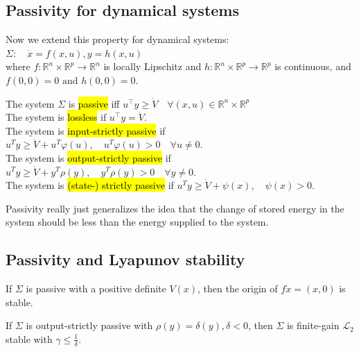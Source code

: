 \subsection{Passivity for dynamical systems}
Now we extend this property for dynamical systems: $\Sigma: \quad \dot{x}=f(x, u), y=h(x, u)$\\
where $f: \mathbb{R}^{n} \times \mathbb{R}^{p} \rightarrow \mathbb{R}^{n}$ is locally Lipschitz and $h: \mathbb{R}^{n} \times \mathbb{R}^{p} \rightarrow \mathbb{R}^{p}$ is continuous, and $f(0,0)=0 \text { and } h(0,0)=0$.

\begin{tcolorbox}[colback=white, colframe=teal]
\begin{definition}
    The system $\Sigma$ is \hl{passive} iff
    $u^{\top} y \geq \dot{V} \quad \forall(x, u) \in \mathbb{R}^{n} \times \mathbb{R}^{p}$\\
    The system is \hl{lossless} if  $u^{\top}y = \dot{V}$.\\
    The system is \hl{input-strictly passive} if $u^{T} y \geq \dot{V}+u^{T} \varphi(u), \quad u^{T} \varphi(u)>0 \quad \forall u \neq 0$.\\
    The system is \hl{output-strictly passive} if $u^{T} y \geq \dot{V}+y^{T} \rho(y), \quad y^{T} \rho(y)>0 \quad \forall y \neq 0$.\\
    The system is \hl{(state-) strictly passive} if $u^{T} y \geq \dot{V}+\psi(x), \quad \psi(x)>0$.
\end{definition}
\end{tcolorbox}

\begin{remark}
    Passivity really just generalizes the idea that the change of stored energy in the system should be less than the energy supplied to the system.
\end{remark}

\subsection{Passivity and Lyapunov stability}
\begin{lemma}
    If $\Sigma$ is passive with a positive definite $V(x)$, then the origin of $f\dot{x}=(x, 0)$ is stable.
\end{lemma}
\begin{lemma}
    If $\Sigma$ is output-strictly passive with $\rho(y) = \delta(y), \delta < 0$, then $\Sigma$ is finite-gain $\mathscr{L}_{2}$ stable with $\gamma \leq \frac{1}{\delta}$.
\end{lemma}

